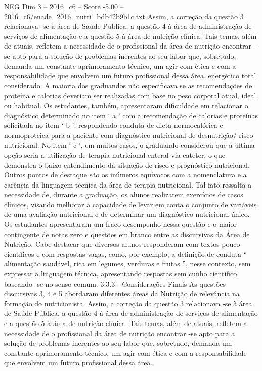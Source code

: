 \begin{textsample}{NEG Dim 3 – 2016\_c6 – Score -5.00 – 2016\_c6/enade\_2016\_nutri\_bdb42b9b1c.txt}
Assim, a correção da questão 3 relacionava -se à área de Saúde Pública, a questão 4 à área de administração de serviços de alimentação e a questão 5 à área de nutrição clínica.
Tais temas, além de atuais, refletem a necessidade de o profissional da área de nutrição encontrar -se apto para a solução de problemas inerentes ao seu labor que, sobretudo, demanda um constante aprimoramento técnico, um agir com ética e com a responsabilidade que envolvem um futuro profissional dessa área. energético total considerado.
A maioria dos graduandos não especificava se as recomendações de proteína e calorias deveriam ser realizadas com base no peso corporal atual, ideal ou habitual.
Os estudantes, também, apresentaram dificuldade em relacionar o diagnóstico determinado no item ‘ a ’ com a recomendação de calorias e proteínas solicitada no item ‘ b ’, respondendo conduta de dieta normocalórica e normoproteica para a paciente com diagnóstico nutricional de desnutrição/ risco nutricional.
No item ‘ c ’, em muitos casos, o graduando considerou que a última opção seria a utilização de terapia nutricional enteral via cateter, o que demonstra o baixo entendimento da situação de risco e prognóstico nutricional.
Outros pontos de destaque são os inúmeros equívocos com a nomenclatura e a carência da linguagem técnica da área de terapia nutricional.
Tal fato ressalta a necessidade de, durante a graduação, os alunos realizarem exercícios de casos clínicos, visando melhorar a capacidade de levar em conta o conjunto de variáveis de uma avaliação nutricional e de determinar um diagnóstico nutricional único.
Os estudantes apresentaram um fraco desempenho nessa questão e o maior contingente de notas zero e questões em branco entre as discursivas da Área de Nutrição.
Cabe destacar que diversos alunos responderam com textos pouco científicos e com respostas vagas, como, por exemplo, a definição de conduta “ alimentação saudável, rica em legumes, verduras e frutas ”, nesse contexto, sem expressar a linguagem técnica, apresentando respostas sem cunho científico, baseando -se no senso comum. 3.3.3 - Considerações Finais As questões discursivas 3, 4 e 5 abordaram diferentes áreas da Nutrição de relevância na formação do nutricionista.
Assim, a correção da questão 3 relacionava -se à área de Saúde Pública, a questão 4 à área de administração de serviços de alimentação e a questão 5 à área de nutrição clínica.
Tais temas, além de atuais, refletem a necessidade de o profissional da área de nutrição encontrar -se apto para a solução de problemas inerentes ao seu labor que, sobretudo, demanda um constante aprimoramento técnico, um agir com ética e com a responsabilidade que envolvem um futuro profissional dessa área.

\end{textsample}
